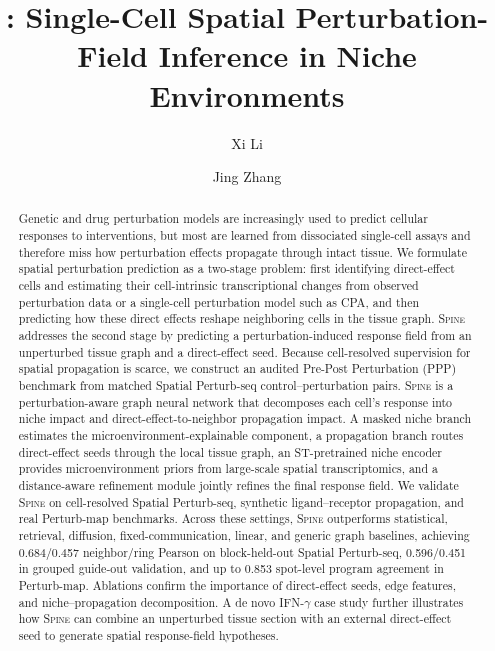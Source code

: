 \documentclass[sigconf,review,balance=false]{acmart}
\title{\methodname{}: Single-Cell Spatial Perturbation-Field Inference in Niche Environments}
\author{Xi Li}
\affiliation{%
  \institution{University of California, Irvine}
  \city{Irvine}
  \state{California}
  \country{USA}
}
\author{Jing Zhang}
\affiliation{%
  \institution{University of California, Irvine}
  \city{Irvine}
  \state{California}
  \country{USA}
}
\newcommand{\methodname}{\textsc{Spine}\xspace}
\begin{document}
\begin{abstract}
Genetic and drug perturbation models are increasingly used to predict cellular responses to interventions, but most are learned from dissociated single-cell assays and therefore miss how perturbation effects propagate through intact tissue. We formulate spatial perturbation prediction as a two-stage problem: first identifying direct-effect cells and estimating their cell-intrinsic transcriptional changes from observed perturbation data or a single-cell perturbation model such as CPA, and then predicting how these direct effects reshape neighboring cells in the tissue graph. \methodname{} addresses the second stage by predicting a perturbation-induced response field from an unperturbed tissue graph and a direct-effect seed. Because cell-resolved supervision for spatial propagation is scarce, we construct an audited Pre-Post Perturbation (PPP) benchmark from matched Spatial Perturb-seq control--perturbation pairs. \methodname{} is a perturbation-aware graph neural network that decomposes each cell's response into niche impact and direct-effect-to-neighbor propagation impact. A masked niche branch estimates the microenvironment-explainable component, a propagation branch routes direct-effect seeds through the local tissue graph, an ST-pretrained niche encoder provides microenvironment priors from large-scale spatial transcriptomics, and a distance-aware refinement module jointly refines the final response field. We validate \methodname{} on cell-resolved Spatial Perturb-seq, synthetic ligand--receptor propagation, and real Perturb-map benchmarks. Across these settings, \methodname{} outperforms statistical, retrieval, diffusion, fixed-communication, linear, and generic graph baselines, achieving 0.684/0.457 neighbor/ring Pearson on block-held-out Spatial Perturb-seq, 0.596/0.451 in grouped guide-out validation, and up to 0.853 spot-level program agreement in Perturb-map. Ablations confirm the importance of direct-effect seeds, edge features, and niche--propagation decomposition. A de novo IFN-$\gamma$ case study further illustrates how \methodname{} can combine an unperturbed tissue section with an external direct-effect seed to generate spatial response-field hypotheses.
\end{abstract}

\maketitle
\end{document}
